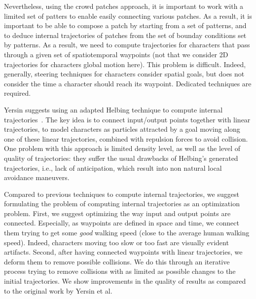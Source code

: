 Nevertheless, using the crowd patches approach, it is important to work with a limited set of patters to enable easily connecting various patches. As a result, it is important to be able to compose a patch by starting from a set of patterns, and to deduce internal trajectories of patches from the set of bounday conditions set by patterns. As a result, we need to compute trajectories for characters that pass through a given set of spatiotemporal waypoints (not that we consider 2D trajectories for characters global motion here). This problem is difficult. Indeed, generally, steering techniques for characters consider spatial goals, but does not consider the time a character should reach its waypoint. Dedicated techniques are required. 

Yersin suggests using an adapted Helbing technique to compute internal trajectories~\cite{Helbing:2005}. The key idea is to connect input/output points together with linear trajectories, to model characters as particles attracted by a goal moving along one of these linear trajectories, combined with repulsion forces to avoid collision. One problem with this approach is limited density level, as well as the level of quality of trajectories: they suffer the usual drawbacks of Helbing's generated trajectories, i.e., lack of anticipation, which result into non natural local avoidance maneuvers. 

Compared to previous techniques to compute internal trajectories, we suggest formulating the problem of computing internal trajectories as an optimization problem. First, we suggest optimizing the way input and output points are connected. Especially, as waypoints are defined in space and time, we connect them trying to get some {\it good} walking speed (close to the average human walking speed). Indeed, characters moving too slow or too fast are visually evident artifacts. Second, after having connected waypoints with linear trajectories, we deform them to remove possible collisions. We do this through an iterative process trying to remove collisions with as limited as possible changes to the initial trajectories. We show improvements in the quality of results as compared to the original work by Yersin et al. 

 

